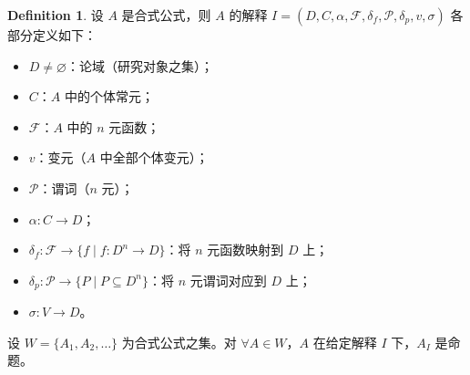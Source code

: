 \documentclass[oneside]{book}
\theoremstyle{definition}
\newtheorem{definition}{Definition}[section]
\begin{document}
\begin{definition}
	设 \( A \) 是合式公式，则 \( A \) 的解释 \( I = (D, C, \alpha, \mathcal{F}, \delta_f, \mathcal{P},\delta_p, v, \sigma) \) 各部分定义如下：
	\begin{itemize}
		\item \( D \neq \varnothing \)：论域（研究对象之集）；
		\item \( C \)：\( A \) 中的个体常元；
		\item \( \mathcal{F} \)：\( A \) 中的 \( n \) 元函数；
		\item \( v \)：变元（\( A \) 中全部个体变元）；
		\item \( \mathcal{P} \)：谓词（\( n \) 元）；
		\item \( \alpha: C \to D \)；
		\item \( \delta_f: \mathcal{F} \to \{ f \mid f: D^n \to D \} \)：将 \( n \) 元函数映射到 \( D \) 上；
		\item \( \delta_p: \mathcal{P} \to \{ P \mid P \subseteq D^n \} \)：将 \( n \) 元谓词对应到 \( D \) 上；
		\item \( \sigma: V \to D \)。
	\end{itemize}
\end{definition}

设 \( W = \{ A_1, A_2, \dots \} \) 为合式公式之集。对 \( \forall A \in W \)，\( A \) 在给定解释 \( I \) 下，\( A_I \) 是命题。
\end{document}
